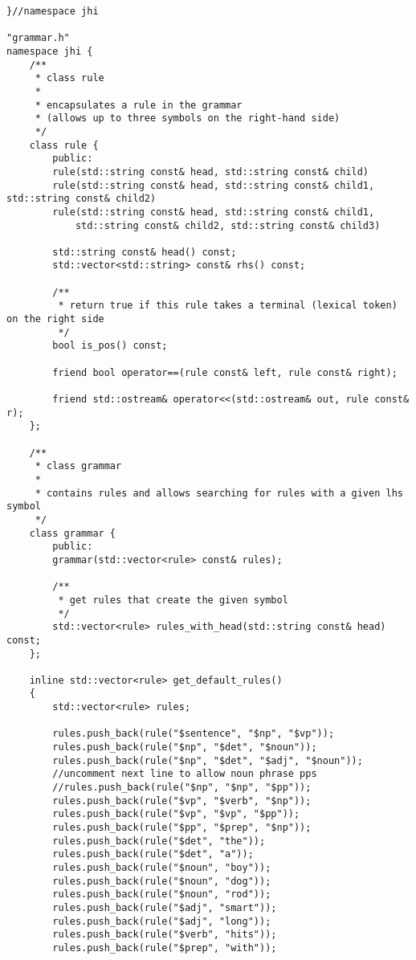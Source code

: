 \documentclass[11pt,a4paper]{jsarticle}
\begin{document}
{\begin{verbatim}
}//namespace jhi

"grammar.h"
namespace jhi {
    /**
     * class rule
     *
     * encapsulates a rule in the grammar
     * (allows up to three symbols on the right-hand side)
     */
    class rule {
        public:
        rule(std::string const& head, std::string const& child)
        rule(std::string const& head, std::string const& child1, std::string const& child2)
        rule(std::string const& head, std::string const& child1,
            std::string const& child2, std::string const& child3)

        std::string const& head() const;
        std::vector<std::string> const& rhs() const;

        /**
         * return true if this rule takes a terminal (lexical token) on the right side
         */
        bool is_pos() const;

        friend bool operator==(rule const& left, rule const& right);

        friend std::ostream& operator<<(std::ostream& out, rule const& r);
    };

    /**
     * class grammar
     *
     * contains rules and allows searching for rules with a given lhs symbol
     */
    class grammar {
        public:
        grammar(std::vector<rule> const& rules);

        /**
         * get rules that create the given symbol
         */
        std::vector<rule> rules_with_head(std::string const& head) const;
    };

    inline std::vector<rule> get_default_rules()
    {
        std::vector<rule> rules;

        rules.push_back(rule("$sentence", "$np", "$vp"));
        rules.push_back(rule("$np", "$det", "$noun"));
        rules.push_back(rule("$np", "$det", "$adj", "$noun"));
        //uncomment next line to allow noun phrase pps
        //rules.push_back(rule("$np", "$np", "$pp"));
        rules.push_back(rule("$vp", "$verb", "$np"));
        rules.push_back(rule("$vp", "$vp", "$pp"));
        rules.push_back(rule("$pp", "$prep", "$np"));
        rules.push_back(rule("$det", "the"));
        rules.push_back(rule("$det", "a"));
        rules.push_back(rule("$noun", "boy"));
        rules.push_back(rule("$noun", "dog"));
        rules.push_back(rule("$noun", "rod"));
        rules.push_back(rule("$adj", "smart"));
        rules.push_back(rule("$adj", "long"));
        rules.push_back(rule("$verb", "hits"));
        rules.push_back(rule("$prep", "with"));


\end{verbatim}}
\end{document}
